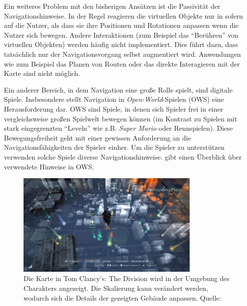 \documentclass[a4paper]{scrartcl}
\begin{document}
Ein weiteres Problem mit den bisherigen Ansätzen ist die Passivität der Navigationshinweise.
In der Regel reagieren die virtuellen Objekte nur in sofern auf die Nutzer, als dass sie ihre Positionen und Rotationen anpassen wenn die Nutzer sich bewegen.
Andere Interaktionen (zum Beispiel das \enquote{Berühren} von virtuellen Objekten) werden häufig nicht implementiert.
Dies führt dazu, dass tatsächlich nur der Navigationsvorgang selbst augmentiert wird.
Anwendungen wie zum Beispiel das Planen von Routen oder das direkte Interagieren mit der Karte sind nicht möglich.

Ein anderer Bereich, in dem Navigation eine große Rolle spielt, sind digitale Spiele.
Insbesondere stellt Navigation in \emph{Open-World}-Spielen (OWS) eine Herausforderung dar.
OWS sind Spiele, in denen sich Spieler frei in einer vergleichsweise großen Spielwelt bewegen können (im Kontrast zu Spielen mit stark eingegrenzten \enquote{Leveln} wie z.B. \emph{Super Mario} oder Rennspielen).
Diese Bewegungsfreiheit geht mit einer gewissen Anforderung an die Navigationsfähigkeiten der Spieler einher.
Um die Spieler zu unterstützen verwenden solche Spiele diverse Navigationshinweise.
\textcite{Lodts2015} gibt einen Überblick über verwendete Hinweise in OWS.

\begin{figure}
	\centering
	\includegraphics[width=0.8\textwidth]{figures/the_division_megamap.jpg}
	\caption{%
		Die Karte in Tom Clancy's: The Division wird in der Umgebung des Charakters angezeigt.
		Die Skalierung kann verändert werden, wodurch sich die Details der gezeigten Gebäude anpassen.
		Quelle: \autocite{MYDIVISION.NET2014}
	}
	\label{fig:the_division_megamap}
\end{figure}
\end{document}
